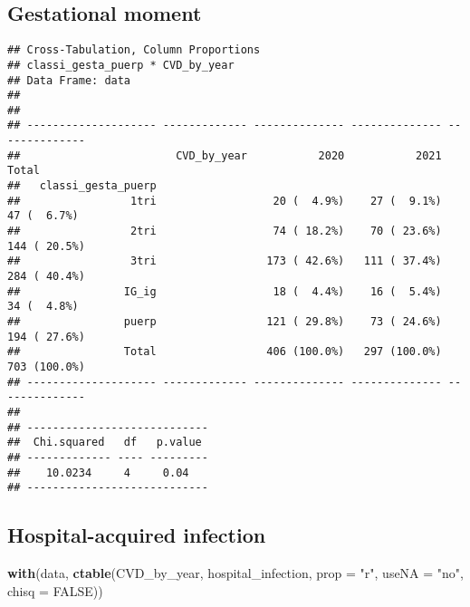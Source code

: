 \documentclass[
]{article}
\newenvironment{Shaded}{\begin{snugshade}}{\end{snugshade}}
\newcommand{\AttributeTok}[1]{\textcolor[rgb]{0.13,0.29,0.53}{#1}}
\newcommand{\ConstantTok}[1]{\textcolor[rgb]{0.56,0.35,0.01}{#1}}
\newcommand{\FunctionTok}[1]{\textcolor[rgb]{0.13,0.29,0.53}{\textbf{#1}}}
\newcommand{\NormalTok}[1]{#1}
\newcommand{\SpecialCharTok}[1]{\textcolor[rgb]{0.81,0.36,0.00}{\textbf{#1}}}
\newcommand{\StringTok}[1]{\textcolor[rgb]{0.31,0.60,0.02}{#1}}
\begin{document}
\hypertarget{gestational-moment}{%
\subsection{Gestational moment}\label{gestational-moment}}

\begin{Shaded}
\end{Shaded}

\begin{verbatim}
## Cross-Tabulation, Column Proportions  
## classi_gesta_puerp * CVD_by_year  
## Data Frame: data  
## 
## 
## -------------------- ------------- -------------- -------------- --------------
##                        CVD_by_year           2020           2021          Total
##   classi_gesta_puerp                                                           
##                 1tri                  20 (  4.9%)    27 (  9.1%)    47 (  6.7%)
##                 2tri                  74 ( 18.2%)    70 ( 23.6%)   144 ( 20.5%)
##                 3tri                 173 ( 42.6%)   111 ( 37.4%)   284 ( 40.4%)
##                IG_ig                  18 (  4.4%)    16 (  5.4%)    34 (  4.8%)
##                puerp                 121 ( 29.8%)    73 ( 24.6%)   194 ( 27.6%)
##                Total                 406 (100.0%)   297 (100.0%)   703 (100.0%)
## -------------------- ------------- -------------- -------------- --------------
## 
## ----------------------------
##  Chi.squared   df   p.value 
## ------------- ---- ---------
##    10.0234     4     0.04   
## ----------------------------
\end{verbatim}

\hypertarget{hospital-acquired-infection}{%
\subsection{Hospital-acquired
infection}\label{hospital-acquired-infection}}

\begin{Shaded}
\begin{Highlighting}[]
\FunctionTok{with}\NormalTok{(data, }\FunctionTok{ctable}\NormalTok{(CVD\_by\_year, hospital\_infection, }\AttributeTok{prop =} \StringTok{"r"}\NormalTok{, }\AttributeTok{useNA =} \StringTok{"no"}\NormalTok{, }\AttributeTok{chisq =} \ConstantTok{FALSE}\NormalTok{))}
\end{Highlighting}
\end{Shaded}
\end{document}
